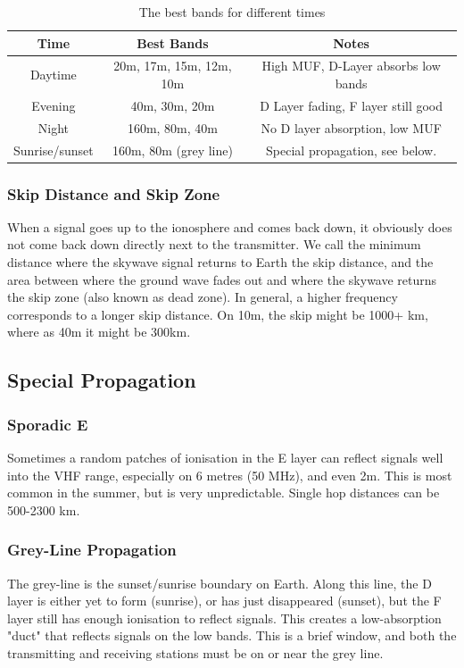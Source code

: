 \documentclass{article}
\begin{document}
\begin{table}[h]
    \centering
    \caption{The best bands for different times}
    \label{tab:5}
    \begin{tabular}{c|c|c}
        Time & Best Bands & Notes \\
        \hline
        \hline
        Daytime & 20m, 17m, 15m, 12m, 10m & High MUF, D-Layer absorbs low bands\\
        Evening & 40m, 30m, 20m & D Layer fading, F layer still good \\
        Night & 160m, 80m, 40m & No D layer absorption, low MUF \\
        Sunrise/sunset & 160m, 80m (grey line) & Special propagation, see below.
    \end{tabular}
\end{table}

\subsubsection{Skip Distance and Skip Zone}
When a signal goes up to the ionosphere and comes back down, it obviously does not come back down directly next to the transmitter. We call the minimum distance where the skywave signal returns to Earth the skip distance, and the area between where the ground wave fades out and where the skywave returns the skip zone (also known as dead zone). In general, a higher frequency corresponds to a longer skip distance. On 10m, the skip might be 1000+ km, where as 40m it might be 300km.

\subsection{Special Propagation}
\subsubsection{Sporadic E}
Sometimes a random patches of ionisation in the E layer can reflect signals well into the VHF range, especially on 6 metres (50 MHz), and even 2m. This is most common in the summer, but is very unpredictable. Single hop distances can be 500-2300 km. 

\subsubsection{Grey-Line Propagation}
The grey-line is the sunset/sunrise boundary on Earth. Along this line, the D layer is either yet to form (sunrise), or has just disappeared (sunset), but the F layer still has enough ionisation to reflect signals. This creates a low-absorption "duct" that reflects signals on the low bands. This is a brief window, and both the transmitting and receiving stations must be on or near the grey line.
\end{document}
